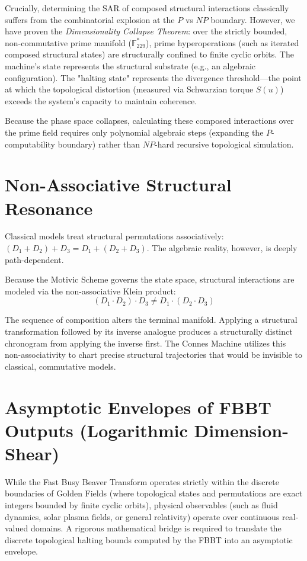 \documentclass[12pt,oneside]{article}
\theoremstyle{principia}
\theoremstyle{definition}
\theoremstyle{remark}
\begin{document}
Crucially, determining the SAR of composed structural interactions classically suffers from the combinatorial explosion at the $P$ vs $NP$ boundary. However, we have proven the \textit{Dimensionality Collapse Theorem}: over the strictly bounded, non-commutative prime manifold ($\mathbb{F}_{229}^*$), prime hyperoperations (such as iterated composed structural states) are structurally confined to finite cyclic orbits. The machine's state represents the structural substrate (e.g., an algebraic configuration). The "halting state" represents the divergence threshold---the point at which the topological distortion (measured via Schwarzian torque $S(u)$) exceeds the system's capacity to maintain coherence. 

Because the phase space collapses, calculating these composed interactions over the prime field requires only polynomial algebraic steps (expanding the $P$-computability boundary) rather than $NP$-hard recursive topological simulation.

\section{Non-Associative Structural Resonance}

Classical models treat structural permutations associatively: $(D_1 + D_2) + D_3 = D_1 + (D_2 + D_3)$. The algebraic reality, however, is deeply path-dependent. 

Because the Motivic Scheme governs the state space, structural interactions are modeled via the non-associative Klein product:
\begin{equation}
    (D_1 \cdot D_2) \cdot D_3 \neq D_1 \cdot (D_2 \cdot D_3)
\end{equation}

The sequence of composition alters the terminal manifold. Applying a structural transformation followed by its inverse analogue produces a structurally distinct chronogram from applying the inverse first. The Connes Machine utilizes this non-associativity to chart precise structural trajectories that would be invisible to classical, commutative models.

\section{Asymptotic Envelopes of FBBT Outputs (Logarithmic Dimension-Shear)}

While the Fast Busy Beaver Transform operates strictly within the discrete boundaries of Golden Fields (where topological states and permutations are exact integers bounded by finite cyclic orbits), physical observables (such as fluid dynamics, solar plasma fields, or general relativity) operate over continuous real-valued domains. A rigorous mathematical bridge is required to translate the discrete topological halting bounds computed by the FBBT into an asymptotic envelope.
\end{document}
